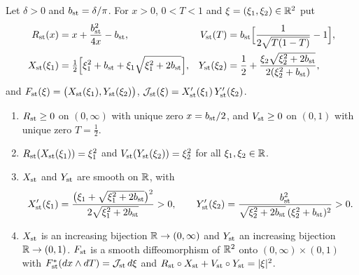 \begin{construction}\label{cons:str-morse}
Let $\delta>0$ and $b_{\rm st}=\delta/\pi$. For $x>0$, $0<T<1$ and $\xi=(\xi_1,\xi_2)\in\mathbb{R}^2$ put
\begin{align*}
 R_{\rm st}(x)&=x+\frac{b_{\rm st}^2}{4x}-b_{\rm st}, &
 V_{\rm st}(T)&=b_{\rm st}\Big[\frac{1}{2\sqrt{T(1-T)}}-1\Big],\\
 X_{\rm st}(\xi_1)&=\tfrac12\Big[\xi_1^2+b_{\rm st}+\xi_1\sqrt{\xi_1^2+2b_{\rm st}}\Big], &
 Y_{\rm st}(\xi_2)&=\frac12+\frac{\xi_2\sqrt{\xi_2^2+2b_{\rm st}}}{2(\xi_2^2+b_{\rm st})} ,
\end{align*}
and $F_{\rm st}(\xi)=\big(X_{\rm st}(\xi_1),Y_{\rm st}(\xi_2)\big)$, $\mathcal J_{\rm st}(\xi)=X_{\rm st}'(\xi_1)\,Y_{\rm st}'(\xi_2)$.
\end{construction}

\begin{lemma}\label{lem:str-morse-inverse}
\begin{enumerate}[label=(\roman*)]
\item $R_{\rm st}\ge0$ on $(0,\infty)$ with unique zero $x=b_{\rm st}/2$, and $V_{\rm st}\ge0$ on $(0,1)$ with unique zero
$T=\frac12$.
\item $R_{\rm st}(X_{\rm st}(\xi_1))=\xi_1^2$ and $V_{\rm st}(Y_{\rm st}(\xi_2))=\xi_2^2$ for all $\xi_1,\xi_2\in\mathbb{R}$.
\item $X_{\rm st}$ and $Y_{\rm st}$ are smooth on $\mathbb{R}$, with
\[
 X_{\rm st}'(\xi_1)=\frac{\big(\xi_1+\sqrt{\xi_1^2+2b_{\rm st}}\big)^2}{2\sqrt{\xi_1^2+2b_{\rm st}}}>0,\qquad
 Y_{\rm st}'(\xi_2)=\frac{b_{\rm st}^2}{\sqrt{\xi_2^2+2b_{\rm st}}\,(\xi_2^2+b_{\rm st})^2}>0 .
\]
\item $X_{\rm st}$ is an increasing bijection $\mathbb{R}\to(0,\infty)$ and $Y_{\rm st}$ an increasing bijection $\mathbb{R}\to(0,1)$.
$F_{\rm st}$ is a smooth diffeomorphism of $\mathbb{R}^2$ onto $(0,\infty)\times(0,1)$ with
$F_{\rm st}^*(dx\wedge dT)=\mathcal J_{\rm st}\,d\xi$ and $R_{\rm st}\circ X_{\rm st}+V_{\rm st}\circ Y_{\rm st}=|\xi|^2$.
\end{enumerate}
\end{lemma}

